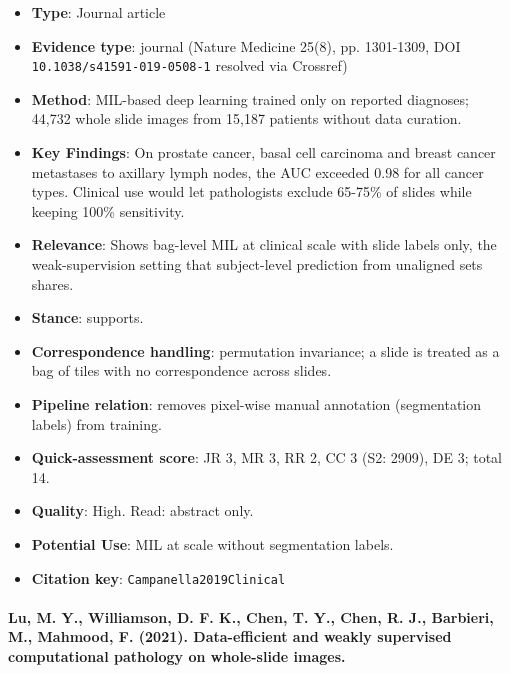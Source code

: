 \documentclass[journal,onecolumn]{IEEEtran}
\begin{document}
\begin{itemize}

\item{} \textbf{Type}: Journal article

\item{} \textbf{Evidence type}: journal (Nature Medicine 25(8), pp. 1301-1309, DOI \nolinkurl{10.1038/s41591-019-0508-1} resolved via Crossref)

\item{} \textbf{Method}: MIL-based deep learning trained only on reported diagnoses; 44,732 whole slide images from 15,187 patients without data curation.

\item{} \textbf{Key Findings}: On prostate cancer, basal cell carcinoma and breast cancer metastases to axillary lymph nodes, the AUC exceeded 0.98 for all cancer types. Clinical use would let pathologists exclude 65-75\% of slides while keeping 100\% sensitivity.

\item{} \textbf{Relevance}: Shows bag-level MIL at clinical scale with slide labels only, the weak-supervision setting that subject-level prediction from unaligned sets shares.

\item{} \textbf{Stance}: supports.

\item{} \textbf{Correspondence handling}: permutation invariance; a slide is treated as a bag of tiles with no correspondence across slides.

\item{} \textbf{Pipeline relation}: removes pixel-wise manual annotation (segmentation labels) from training.

\item{} \textbf{Quick-assessment score}: JR 3, MR 3, RR 2, CC 3 (S2: 2909), DE 3; total 14.

\item{} \textbf{Quality}: High. Read: abstract only.

\item{} \textbf{Potential Use}: MIL at scale without segmentation labels.

\item{} \textbf{Citation key}: \texttt{Campanella2019Clinical}

\end{itemize}

\paragraph{Lu, M. Y., Williamson, D. F. K., Chen, T. Y., Chen, R. J., Barbieri, M., Mahmood, F. (2021). Data-efficient and weakly supervised computational pathology on whole-slide images.~\cite{Lu2021CLAM}}\mbox{}
\end{document}
